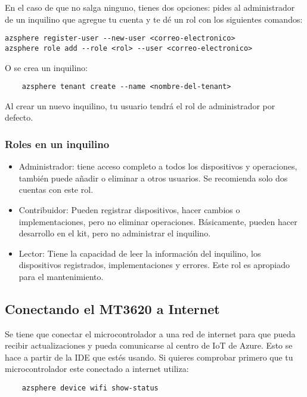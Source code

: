 En el caso de que no salga ninguno, tienes dos opciones: pides al administrador de un inquilino que agregue tu cuenta y te dé un rol con los siguientes comandos:
\begin{verbatim}
azsphere register-user --new-user <correo-electronico>
azsphere role add --role <rol> --user <correo-electronico>
\end{verbatim}
O se crea un inquilino:
\begin{verbatim}
	azsphere tenant create --name <nombre-del-tenant>
\end{verbatim}
Al crear un nuevo inquilino, tu usuario tendrá el rol de administrador por defecto.


\subsubsection{Roles en un inquilino}
\begin{itemize}
	\item 
	Administrador: tiene acceso completo a todos los dispositivos y operaciones, también puede añadir o eliminar a otros usuarios. Se recomienda solo dos cuentas con este rol.
	\item 
	Contribuidor: Pueden registrar dispositivos, hacer cambios o implementaciones, pero no eliminar operaciones. Básicamente, pueden hacer desarrollo en el kit, pero no administrar el inquilino.
	\item 
	Lector: Tiene la capacidad de leer la información del inquilino, los dispositivos registrados, implementaciones y errores. Este rol es apropiado para el mantenimiento.
	
\end{itemize}

\subsection{Conectando el MT3620 a Internet}
Se tiene que conectar el microcontrolador a una red de internet para que pueda recibir actualizaciones y pueda comunicarse al centro de IoT de Azure. Esto se hace a partir de la IDE que estés usando.
Si quieres comprobar primero que tu microcontrolador este conectado a internet utiliza:

\begin{verbatim}
	azsphere device wifi show-status
\end{verbatim}

